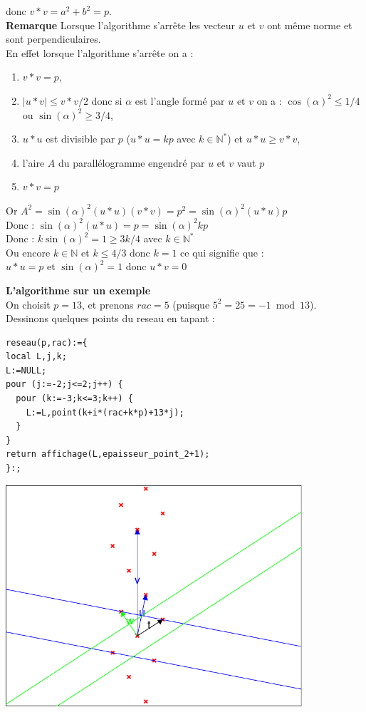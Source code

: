 \documentclass[a4paper,11pt]{book}
\newcommand{\N}{{\mathbb{N}}}
\begin{document}
\begin{itemize}
donc $v*v=a^2+b^2=p$.\\
{\bf Remarque}
Lorsque l'algorithme s'arr\^ete les vecteur $u$ et $v$ ont m\^eme norme et 
sont perpendiculaires.\\ 
En effet  lorsque l'algorithme s'arr\^ete on a :
\begin{enumerate}
\item $v*v=p$,
\item $|u*v|\leq v*v/2$ donc si $\alpha$ est l'angle form\'e par $u$ et $v$ on 
a : $\cos(\alpha)^2\leq 1/4$ ou $\sin(\alpha)^2\geq 3/4$,
\item $u*u$ est divisible par $p$ ($u*u=kp$ avec $k\in\N^*$) et $u*u\geq v*v$,
\item l'aire $A$ du parall\'elogramme engendr\'e par $u$ et $v$ vaut $p$
\item $v*v=p$
\end{enumerate}
Or $A^2=\sin(\alpha)^2(u*u)(v*v)=p^2=\sin(\alpha)^2(u*u)p$\\
Donc : $\sin(\alpha)^2(u*u)=p=\sin(\alpha)^2kp$\\
Donc : $k \sin(\alpha)^2=1\geq 3k/4$ avec $k\in\N^*$\\
Ou encore $k\in\N$ et $k\leq 4/3$ donc $k=1$ ce qui signifie que :\\
$u*u=p$ et  $\sin(\alpha)^2=1$ donc $u*v=0$\\
\end{itemize}
{\bf L'algorithme sur un exemple}\\
On choisit $p=13$, et prenons $rac =5$ (puisque $5^2=25=-1 \bmod 13$).\\
Dessinons quelques points du reseau en tapant :
\begin{verbatim}
reseau(p,rac):={
local L,j,k;
L:=NULL;
pour (j:=-2;j<=2;j++) {
  pour (k:=-3;k<=3;k++) {
    L:=L,point(k+i*(rac+k*p)+13*j);
  }
}
return affichage(L,epaisseur_point_2+1);
}:;
\end{verbatim}
\includegraphics[width=11cm]{alga2b2}\\
\end{document}
